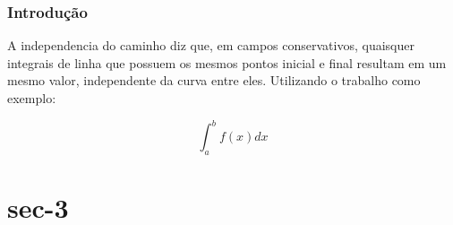 \documentclass{beamer}
\begin{document}
\begin{frame}
% 
% 
% 
% 
% 
% 

\begin{frame}
    \frametitle{Introdução}
    A independencia do caminho diz que, em campos conservativos, quaisquer integrais de linha que possuem os mesmos pontos inicial e final resultam em um mesmo valor, independente da curva 
    entre eles. Utilizando o trabalho como exemplo:
    
    \begin{equation}
    \int_{a}^b f(x)dx
    \end{equation}


% 

\end{frame}

\section{sec-3}


\end{frame}
\end{document}
